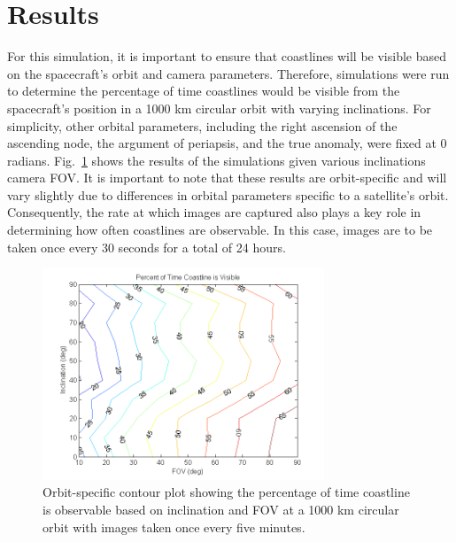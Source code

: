 \documentclass[]{aiaa-tc}%
\begin{document}
\section{Results}
For this simulation, it is important to ensure that coastlines will be visible based on the spacecraft's orbit and camera parameters.  Therefore, simulations were run to determine the percentage of time coastlines would be visible from the spacecraft's position in a 1000 km circular orbit with varying inclinations.  For simplicity, other orbital parameters, including the right ascension of the ascending node, the argument of periapsis, and the true anomaly, were fixed at 0 radians.  Fig.~\ref{fig:contourplot} shows the results of the simulations given various inclinations camera FOV.  It is important to note that these results are orbit-specific and will vary slightly due to differences in orbital parameters specific to a satellite's orbit. Consequently, the rate at which images are captured also plays a key role in determining how often coastlines are observable.  In this case, images are to be taken once every 30 seconds for a total of 24 hours.
\begin{figure}[ht!]
\centering
\includegraphics[width=0.75\textwidth]{contourplot} %
\caption{Orbit-specific contour plot showing the percentage of time coastline is observable based on inclination and FOV at a 1000 km circular orbit with images taken once every five minutes.}
\label{fig:contourplot}
\end{figure}

\end{document}
